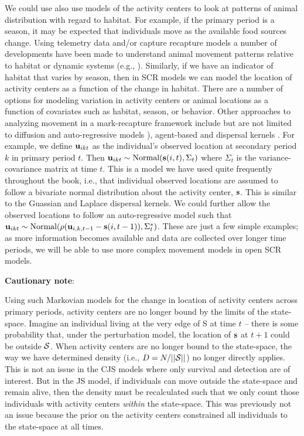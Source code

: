 We could use also use models of the activity centers to look at
patterns of animal distribution with regard to habitat.  For example,
if the primary period is a season, it may be expected that individuals
move as the available food sources change. Using telemetry data and/or
capture recapture models a number of developments have been made to
understand animal movement patterns relative to habitat or dynamic
systems (e.g., \cite{jonsen_etal:2005, hooten_wikle:2010}).
Similarly, if we have an indicator of habitat that varies by season,
then in SCR models we can model the location of activity centers as a
function of the change in habitat.  There are a number of options for
modeling variation in activity centers or animal locations as a
function of covariates such as habitat, season, or behavior.  Other
approaches to analyzing movement in a mark-recapture framework include
but are not limited to diffusion and auto-regressive models
\citep{ovaskainen:2004, ovaskainen_etal:2008}), agent-based
\citep{grimm_etal:2005, hooten_etal:2010} and dispersal kernels
\citep{fujiwara_etal:2006}.  For example, we define ${\bf u}_{ikt}$ as
the individual's observed location at secondary period $k$ in primary
period $t$.  Then ${\bf u}_{ikt} \sim \mbox{Normal}({\bf s}(i,t),
\Sigma_t)$ where $\Sigma_t$ is the variance-covariance matrix at time
$t$.  This is a model we have used quite frequently throughout the
book, i.e., that individual observed locations are assumed to follow a
bivariate normal distribution about the activity center, ${\bf s}$.
This is similar to
the Guassian and Laplace dispersal kernels.  We could further allow the
observed locations to follow an auto-regressive model such that ${\bf
  u}_{ikt} \sim \mbox{Normal}(\rho ({\bf u}_{i,k,t-1} - {\bf
  s}(i,t-1)), \Sigma^{*}_t)$.  These are just a few simple examples; as
more information becomes available and data are collected over longer
time periods, we will be able to use more complex movement models in open SCR models.


{\flushleft \bf Cautionary note}: 

Using such Markovian models for the
change in location of activity centers across primary periods,
activity centers are no longer bound by the limits of the state-space.
Imagine an individual living at the very edge of S at time $t$ --
there is some probability that, under the perturbation model, the
location of ${\bf s}$ at $t+1$ could be outside ${\cal S}$.  When
activity centers are no longer bound to the state-space, the way we
have determined density (i.e., $D = N/||{\cal S}||$) no longer
directly applies.  This is not an issue in the CJS models where only
survival and detection are of interest.  But in the JS model, if
individuals can move outside the state-space and remain alive, then
the density must be recalculated such that we only count those
individuals with activity centers {\it within} the state-space.  This
was previously not an issue because the prior on the activity centers
constrained all individuals to the state-space at all times.

